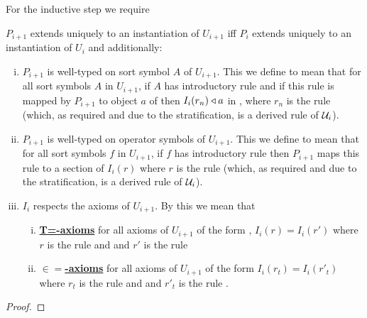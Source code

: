 For the inductive step we require
\begin{lemmastar}
\item $P_{i+1}$ extends uniquely to an instantiation of $U_{i+1}$ iff  $P_i$ extends uniquely to an instantiation of $U_{i}$ and additionally:
\begin{enumerate}[(i)]
\item
$P_{i+1}$ is well-typed on sort symbol $A$ of $U_{i+1}$. This we define to mean that
for all sort symbols $A$ in $U_{i+1}$, if $A$ has introductory rule 
\genericAintroductoryrule and if this rule is mapped by $P_{i+1}$
to object $a$ of \catcw then $I_i(r_n) \triangleleft a$ in \catc, where $r_n$ is the rule 
 (which, as required and due to the stratification, is a derived rule of $\mathcal{U}_i$).
\item  $P_{i+1}$ is well-typed on operator symbols  of $U_{i+1}$. This we define to mean that
for all sort symbols $f$ in $U_{i+1}$, if $f$ has introductory rule 
\genericfintroductoryrule then $P_{i+1}$ maps this rule to a section 
of $I_i(r)$ where $r$ is the rule
 (which, as required and due to the stratification, is a derived rule of $\mathcal{U}_i$). 
\item
 $I_i$ respects the axioms of $U_{i+1}$. By this we mean that 
\begin{enumerate}[(i)]
\item \underline{\textbf{T=-axioms}} 
for all axioms of $U_{i+1}$ of the form
 ,
$I_i(r) = I_i(r')$ where $r$ is the rule
 and  
and $r'$ is the rule 
\item \underline{\textbf{$\boldsymbol{\in=}$-axioms}} 
for all axioms of $U_{i+1}$ of the form
$I_i(r_t) = I_i(r'_t)$ where $r_t$ is the rule
 and  
and $r'_t$ is the rule .
\end{enumerate}
\end{enumerate}
\end{lemmastar}
\begin{proof} 
\tbd
\end{proof}

